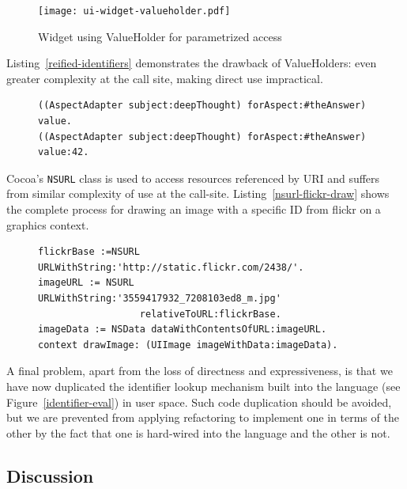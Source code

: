 \documentclass{acm_proc_article-sp}
\begin{document}
\begin{figure}[htbp]
\centering
\texttt{[image: ui-widget-valueholder.pdf]}
\caption{Widget using ValueHolder for parametrized access}
\label{ui-widget-valueholder}

\end{figure}

Listing~\ref{reified-identifiers} demonstrates the drawback of ValueHolders:  even greater complexity at the
call site, making direct use impractical. 


\begin{figure}[htbp]
\begin{lstlisting}[style=numbers,label=reified-identifiers,caption=Retrieve and store value via AspectAdaptor ValueHolder.]
((AspectAdapter subject:deepThought) forAspect:#theAnswer) value.
((AspectAdapter subject:deepThought) forAspect:#theAnswer) value:42.
\end{lstlisting}
\end{figure}

Cocoa's {\tt NSURL} class is used to access resources referenced by URI and suffers from similar complexity
of use at the call-site.  Listing~\ref{nsurl-flickr-draw}
shows the complete process for drawing an image with a specific ID from flickr on a graphics context.

\begin{figure}[htbp]
\begin{lstlisting}[style=numbers,label=nsurl-flickr-draw,caption=Retrieving and drawing an image stored on flickr.com.]
flickrBase :=NSURL URLWithString:'http://static.flickr.com/2438/'.
imageURL := NSURL URLWithString:'3559417932_7208103ed8_m.jpg'
                  relativeToURL:flickrBase.
imageData := NSData dataWithContentsOfURL:imageURL.
context drawImage: (UIImage imageWithData:imageData).
\end{lstlisting}
\end{figure}


A final problem, apart from the loss of directness and expressiveness, is that we have now 
duplicated the identifier lookup mechanism built into the language (see Figure~\ref{identifier-eval})
in user space.  Such code duplication should be avoided, but we are prevented from applying refactoring
to implement one in terms of the other by the fact that one is hard-wired into the language and the other is not.

\subsection{Discussion}
\end{document}
